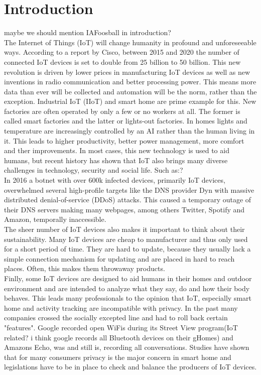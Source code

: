 \section{Introduction}

maybe we should mention IAFoosball in introduction?
\\
The Internet of Things (IoT) will change humanity in profound and unforeseeable ways\cite{ciscoReport}. According to a report by Cisco, between 2015 and 2020 the number of connected IoT devices is set to double from 25 billion to 50 billion\cite{ciscoReport}. This new revolution is driven by lower prices in manufacturing IoT devices as well as new inventions in radio communication and better processing power. This means more data than ever will be collected and automation will be the norm, rather than the exception. Industrial IoT (IIoT) and smart home are prime example for this. New factories are often operated by only a few or no workers at all. The former is called smart factories and the latter or lights-out factories\cite{smartVSLightoutFactories:online}. In homes lights and temperature are increasingly controlled by an AI rather than the human living in it. This leads to higher productivity, better power management, more comfort and ther improvements. In most cases, this new technology is used to aid humans, but recent history has shown that IoT also brings many diverse challenges in technology, security and social life. Such as:?\\

In 2016 a botnet with over 600k infected devices, primarily IoT devices, overwhelmed several high-profile targets like the DNS provider Dyn with massive distributed denial-of-service (DDoS) attacks. This caused a temporary outage of their DNS servers making many webpages, among others  Twitter, Spotify and Amazon, temporally inaccessible.\\

The sheer number of IoT devices also makes it important to think about their sustainability. Many IoT devices are cheap to manufacturer and thus only used for a short period of time. They are hard to update, because they usually lack a simple connection mechanism for updating and are placed in hard to reach places. Often, this makes them throwaway products.\\

Finlly, some IoT devices are designed to aid humans in their homes and outdoor environment and are intended to analyze what they say, do and how their body behaves. This leads many professionals to the opinion that IoT, especially smart home and activity tracking are incompatible with privacy\cite{5Reasons41:online}. In the past many companies crossed the socially excepted line and had to roll back certain "features"\cite{PrivacyIoT50:online}. Google recorded open WiFis during its Street View program(IoT related? i think google records all Bluetooth devices on their gHomes) and Amazons Echo, was and still is, recording all conversations. Studies have shown that for many consumers privacy is the major concern in smart home\cite{PrivacyIoT50:online} and legislations have to be in place to check and balance the producers of IoT devices.\\

